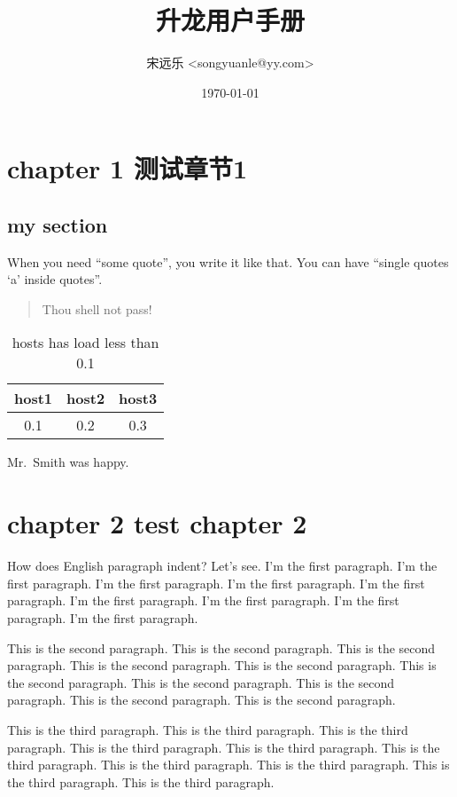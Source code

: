 \documentclass[a4paper,10pt,notitlepage,openany]{book}
\title{升龙用户手册}
\author{宋远乐 <songyuanle@yy.com>}
\date{\today}
\begin{document}
\maketitle
\tableofcontents
\chapter{chapter 1 测试章节1}
\section{my section}
When you need ``some quote'', you write it like that.
You can have ``single quotes `a' inside quotes''.

\begin{quote}
  Thou shell not pass!
\end{quote}
\begin{table}[htp]
  \label{table:host-load}
  \caption{hosts has load less than 0.1}
  \begin{tabular}{|c|c|c|}
    \hline
    host1 & host2 & host3 \\
    \hline
    0.1 & 0.2 & 0.3 \\
    \hline
  \end{tabular}
\end{table}

Mr.~Smith was happy.

\chapter{chapter 2 test chapter 2}

How does English paragraph indent? Let's see. I'm the first paragraph. I'm the first paragraph. I'm the first paragraph. I'm the first paragraph. I'm the first paragraph. I'm the first paragraph. I'm the first paragraph. I'm the first paragraph. I'm the first paragraph.

This is the second paragraph. This is the second paragraph. This is the second paragraph. This is the second paragraph. This is the second paragraph. This is the second paragraph. This is the second paragraph. This is the second paragraph. This is the second paragraph. This is the second paragraph. 

This         is the third paragraph. This         is the third paragraph. This         is the third paragraph. This         is the third paragraph. This         is the third paragraph. This         is the third paragraph. This         is the third paragraph. This         is the third paragraph. This         is the third paragraph. This         is the third paragraph. 
\end{document}

